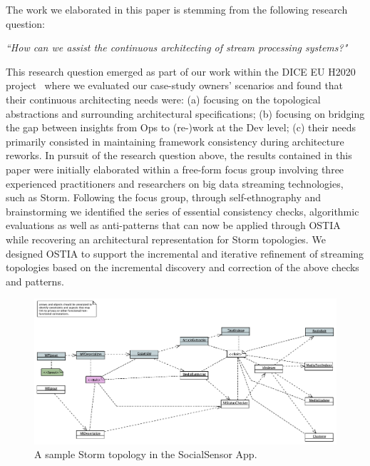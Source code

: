 
The work we elaborated in this paper is stemming from the following research question:

\begin{center}
\emph{``How can we assist the continuous architecting of stream processing systems?"}
\end{center}

This research question emerged as part of our work within the DICE EU H2020 project~\cite{dice2020}
where we evaluated our case-study owners' scenarios and found that their continuous architecting needs were: (a) focusing on the topological abstractions and surrounding architectural specifications; (b) focusing on bridging the gap between insights from Ops to (re-)work at the Dev level; (c) their needs primarily consisted in maintaining framework consistency during architecture reworks.
In pursuit of the research question above, the results contained in this paper were initially elaborated within a free-form focus group \cite{focusgroup} involving three experienced practitioners and researchers on big data streaming technologies, such as Storm. Following the focus group, through self-ethnography \cite{selfeth} and brainstorming we identified the series of essential consistency checks, algorithmic evaluations as well as anti-patterns that can now be applied through OSTIA while recovering an architectural representation for Storm topologies. We designed OSTIA
to support the incremental and iterative refinement of streaming topologies based on the incremental discovery and correction of the above checks and patterns.

\begin{figure}
  \centering
  \includegraphics[width=12cm]{images/socialsensor}
  \caption{A sample Storm topology in the SocialSensor App.}
  \label{socialsensor-topology}
\end{figure}

